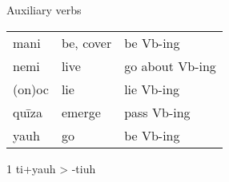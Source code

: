 \documentclass[12pt]{beamer}
\newcommand{\nah}[1]{\textcolor{nahgrn}{#1}}
\newcommand{\trs}[1]{\textcolor{nahblu}{#1}}
\begin{document}
\begin{frame}
\begin{columns}[t]
\begin{column}{.18\linewidth}
\begin{block}{Auxiliary verbs}
\begin{threeparttable}
\begin{tabular}{lll}
            \nah{mani}               & \trs{be, cover}             & \trs{be Vb-ing}          \\
            \nah{nemi}               & \trs{live}                  & \trs{go   about Vb-ing}  \\
            \nah{(on)oc}             & \trs{lie}                   & \trs{lie   Vb-ing}       \\
            \nah{quīza}              & \trs{emerge}                & \trs{pass   Vb-ing}      \\
            \nah{yauh}\tnote{1}      & \trs{go}                    & \trs{be Vb-ing}          \\
          \end{tabular}
          \begin{tablenotes}
            \item[1] \nah{ti+yauh} > \nah{-tiuh}
          \end{tablenotes}
        \end{threeparttable}


\end{block}
\end{column}
\end{columns}
\end{frame}
\end{document}
